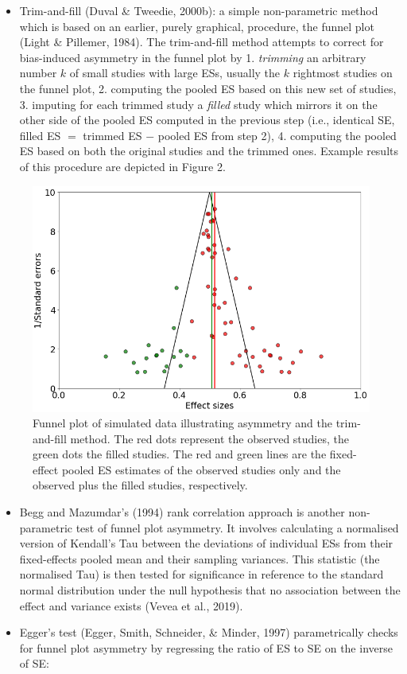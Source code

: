 \documentclass[
  man,floatsintext]{apa6}
\providecommand{\tightlist}{%
  \setlength{\itemsep}{0pt}\setlength{\parskip}{0pt}}
\begin{document}
\begin{itemize}
\tightlist
\item
  Trim-and-fill (Duval \& Tweedie, 2000b): a simple non-parametric method which is based on an earlier, purely graphical, procedure, the funnel plot (Light \& Pillemer, 1984).
  The trim-and-fill method attempts to correct for bias-induced asymmetry in the funnel plot by 1. \emph{trimming} an arbitrary number \(k\) of small studies with large ESs, usually the \(k\) rightmost studies on the funnel plot, 2. computing the pooled ES based on this new set of studies, 3. imputing for each trimmed study a \emph{filled} study which mirrors it on the other side of the pooled ES computed in the previous step (i.e., identical SE, filled ES \(=\) trimmed ES \(-\) pooled ES from step 2), 4. computing the pooled ES based on both the original studies and the trimmed ones. Example results of this procedure are depicted in Figure 2.
\end{itemize}

\begin{figure}[H]

{\centering \includegraphics[width=0.6\linewidth]{figures/fig1} 

}

\caption{Funnel plot of simulated data illustrating asymmetry and the trim-and-fill method. The red dots represent the observed studies, the green dots the filled studies. The red and green lines are the fixed-effect pooled ES estimates of the observed studies only and the observed plus the filled studies, respectively.}\label{fig:fig2}
\end{figure}
\vspace{-6mm}

\begin{itemize}
\item
  Begg and Mazumdar's (1994) rank correlation approach is another non-parametric test of funnel plot asymmetry. It involves calculating a normalised version of Kendall's Tau between the deviations of individual ESs from their fixed-effects pooled mean and their sampling variances. This statistic (the normalised Tau) is then tested for significance in reference to the standard normal distribution under the null hypothesis that no association between the effect and variance exists (Vevea et al., 2019).
\item
  Egger's test (Egger, Smith, Schneider, \& Minder, 1997) parametrically checks for funnel plot asymmetry by regressing the ratio of ES to SE on the inverse of SE:
\end{itemize}
\end{document}
